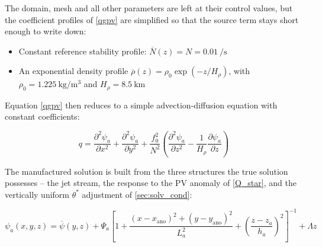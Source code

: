 \documentclass{article}
\begin{document}
The domain, mesh and all other parameters are left at their control values, but the coefficient profiles of \cref{qgpv} are simplified so that the source term stays short enough to write down:

\begin{itemize}
    \item Constant reference stability profile: $\overline{N}(z)=N=\qty{0.01}{\per\second}$ \cite{Vallis2017}
    \item An exponential density profile $\overline{\rho}(z)=\rho_0 \exp (-z/H_\rho)$, with $\rho_0 = \qty{1.225}{\kilo\gram\per\meter\cubed}$ and $H_\rho = \qty{8.5}{\km}$ \cite{Stull2015}
\end{itemize}

Equation \eqref{qgpv} then reduces to a simple advection-diffusion equation with constant coefficients:

\begin{equation}\label{mms_source}
    q = \frac{\partial ^2 \psi_a}{\partial x^2} + \frac{\partial ^2 \psi_a}{\partial y^2} + \frac{f_0^2}{N^2} \left( \frac{\partial ^2 \psi_a}{\partial z^2} - \frac{1}{H_\rho} \frac{\partial \psi_a}{\partial z}\right)
\end{equation}

The manufactured solution is built from the three structures the true solution possesses -- the jet stream, the response to the PV anomaly of \cref{Q_star}, and the vertically uniform $\theta^*$ adjustment of \cref{sec:solv_cond}:

\begin{equation}\label{mms_psi}
    \psi_a(x,y,z) = \overline{\psi}(y,z)
    + \Psi_a \left[1 + \frac{\left(x - x_\text{ano}\right)^2 + \left(y - y_\text{ano}\right)^2}{L_a^2} + \left(\frac{z - z_a}{h_a}\right)^2\right]^{-1}
    + \Lambda z
\end{equation}
\end{document}
